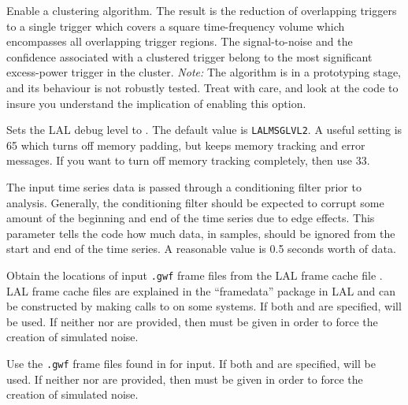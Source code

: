 \begin{entry}
\begin{entry}
\item[\option{--cluster}]
Enable a clustering algorithm.  The result is the reduction of overlapping
triggers to a single trigger which covers a square time-frequency volume
which encompasses all overlapping trigger regions.   The signal-to-noise
and the confidence associated with a clustered trigger belong to the most
significant excess-power trigger in the cluster.  \emph{Note:}  The
algorithm is in a prototyping stage, and its behaviour is not robustly
tested.  Treat with care, and look at the code to insure you understand the
implication of enabling this option.

\item[\option{--debug-level} \parm{level}]
Sets the LAL debug level to .  The default value is
\texttt{LALMSGLVL2}.  A useful setting is 65 which turns off memory
padding, but keeps memory tracking and error messages.  If you want to turn
off memory tracking completely, then use 33.

\item[\option{--filter-corruption} \parm{samples}]
The input time series data is passed through a conditioning filter prior to
analysis.  Generally, the conditioning filter should be expected to corrupt
some amount of the beginning and end of the time series due to edge
effects.  This parameter tells the code how much data, in samples, should
be ignored from the start and end of the time series.  A reasonable value
is 0.5 seconds worth of data.

\item[\option{--frame-cache} \parm{cache file}]
Obtain the locations of input \texttt{.gwf} frame files from the LAL frame
cache file .  LAL frame cache files are explained in the
``framedata'' package in LAL and can be constructed by making calls to
 on some systems.  If both  and
 are specified,  will be used.  If
neither  nor  are provided, then
 must be given in order to force the creation of
simulated noise.

\item[\option{--frame-dir} \parm{directory}]
Use the \texttt{.gwf} frame files found in  for input.  If
both  and  are specified,
 will be used.  If neither  nor
 are provided, then  must be
given in order to force the creation of simulated noise.


\end{entry}
\end{entry}
